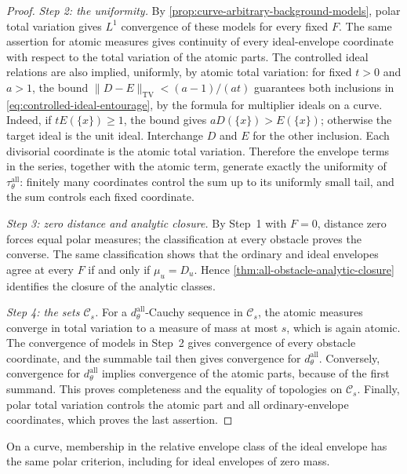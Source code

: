 \begin{proof}
\emph{Step 2: the uniformity.} By \cref{prop:curve-arbitrary-background-models}, polar total variation gives $L^1$ convergence of these models for every fixed $F$. The same assertion for atomic measures gives continuity of every ideal-envelope coordinate with respect to the total variation of the atomic parts. The controlled ideal relations are also implied, uniformly, by atomic total variation: for fixed $t>0$ and $a>1$, the bound $\|D-E\|_{\mathrm{TV}}<(a-1)/(at)$ guarantees both inclusions in \eqref{eq:controlled-ideal-entourage}, by the formula for multiplier ideals on a curve. Indeed, if $tE(\{x\})\geq1$, the bound gives $aD(\{x\})>E(\{x\})$; otherwise the target ideal is the unit ideal. Interchange $D$ and $E$ for the other inclusion. Each divisorial coordinate is the atomic total variation. Therefore the envelope terms in the series, together with the atomic term, generate exactly the uniformity of $\tau^{\mathrm{all}}_\theta$: finitely many coordinates control the sum up to its uniformly small tail, and the sum controls each fixed coordinate.

\emph{Step 3: zero distance and analytic closure.} By Step~1 with $F=0$, distance zero forces equal polar measures; the classification at every obstacle proves the converse. The same classification shows that the ordinary and ideal envelopes agree at every $F$ if and only if $\mu_u=D_u$. Hence \cref{thm:all-obstacle-analytic-closure} identifies the closure of the analytic classes.

\emph{Step 4: the sets $\mathcal C_s$.} For a $d^{\mathrm{all}}_\theta$-Cauchy sequence in $\mathcal C_s$, the atomic measures converge in total variation to a measure of mass at most $s$, which is again atomic. The convergence of models in Step~2 gives convergence of every obstacle coordinate, and the summable tail then gives convergence for $d^{\mathrm{all}}_\theta$. Conversely, convergence for $d^{\mathrm{all}}_\theta$ implies convergence of the atomic parts, because of the first summand. This proves completeness and the equality of topologies on $\mathcal C_s$. Finally, polar total variation controls the atomic part and all ordinary-envelope coordinates, which proves the last assertion.
\end{proof}

On a curve, membership in the relative envelope class of the ideal envelope has the same polar criterion, including for ideal envelopes of zero mass.

